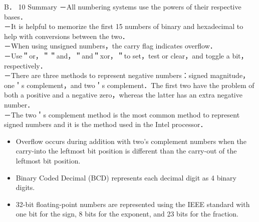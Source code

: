 \documentclass[10pt]{book}
\begin{document}
B． 10 Summary
－All numbering systems use the powers of their respective bases．\\
－It is helpful to memorize the first 15 numbers of binary and hexadecimal to help with conversions between the two．\\
－When using unsigned numbers，the carry flag indicates overflow．\\
－Use＂or，＂＂and，＂and＂xor，＂to set，test or clear，and toggle a bit，respectively．\\
－There are three methods to represent negative numbers：signed magnitude，one＇s complement，and two＇s complement．The first two have the problem of both a positive and a negative zero，whereas the latter has an extra negative number．\\
－The two＇s complement method is the most common method to represent signed numbers and it is the method used in the Intel processor．

\begin{itemize}
  \item Overflow occurs during addition with two's complement numbers when the carry-into the leftmost bit position is different than the carry-out of the leftmost bit position.
  \item Binary Coded Decimal (BCD) represents each decimal digit as 4 binary digits.
  \item 32-bit floating-point numbers are represented using the IEEE standard with one bit for the sign, 8 bits for the exponent, and 23 bits for the fraction.
\end{itemize}
\end{document}
